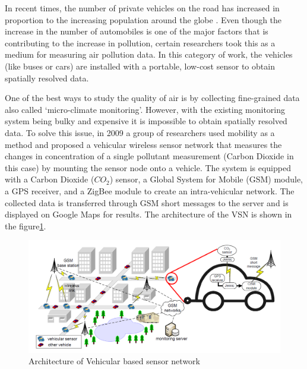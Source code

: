 In recent times, the number of private vehicles on the road has increased in proportion to the increasing population around the globe \cite{Downs2004}. Even though the increase in the number of automobiles is one of the major factors that is contributing to the increase in pollution, certain researchers took this as a medium for measuring air pollution data. In this category of work, the vehicles (like buses or cars) are installed with a portable, low-cost sensor to obtain spatially resolved data. 
\par
 One of the best ways to study the quality of air is by collecting fine-grained data also called \lq{micro-climate monitoring}\rq. However, with the existing monitoring system being bulky and expensive it is impossible to obtain spatially resolved data. To solve this issue, in 2009 a group of researchers used mobility as a method and proposed a vehicular wireless sensor network \cite{Hu2009} that measures the changes in concentration of a single pollutant measurement (Carbon Dioxide in this case) by mounting the sensor node onto a vehicle. The system is equipped with a Carbon Dioxide ($CO_2$) sensor, a Global System for Mobile (GSM) module, a GPS receiver, and a ZigBee module to create an intra-vehicular network. The collected data is transferred through GSM short messages to the server and is displayed on Google Maps for results. The architecture of the VSN is shown in the figure\ref{vsn}. 

 \begin{figure}[h!]
  \begin{center}
  \includegraphics[scale=0.65]{./images/figure40.png}
  \end{center}
 
  \caption{Architecture of Vehicular based sensor network \cite{Hu2009}}
  
  \label{vsn}
\end{figure}
 
